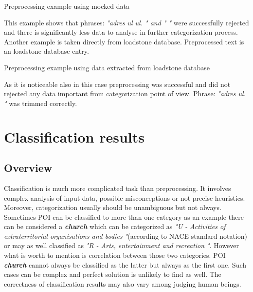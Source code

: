 \begin{algorithm}
	
	\hfill \break
	\caption{Preprocessing example using mocked data}
	\label{alg:1st}
\end{algorithm}

This example shows that phrases: \textit{"adres ul ul. " and " "} were successfully rejected and there is significantly less data to analyse in further categorization process.
\newline
Another example is taken directly from loadstone database. Preprocessed text is an loadstone database entry.
\begin{algorithm}
	
	\hfill \break
	\caption{Preprocessing example using data extracted from loadstone database}
	\label{alg:2nd}
\end{algorithm}
\newline
As it is noticeable also in this case preprocessing was successful and did not rejected any data important from categorization point of view. Phrase: \textit{"adres ul. "} was trimmed correctly.
 
  
\section{Classification results}
\label{classification_results}
\subsection{Overview}
Classification is much more complicated task than preprocessing. It involves complex analysis of input data, possible misconceptions or not precise heuristics. Moreover, categorization usually should be unambiguous but not always. Sometimes POI can be classified to more than one category as an example there can be considered a \textit{\textbf{church}} which can be categorized as \textit{"U - Activities of extraterritorial organisations and bodies "}(according to NACE standard notation) or may as well classified as \textit{"R - Arts, entertainment and recreation "}. However what is worth to mention is correlation between those two categories. POI \textit{\textbf{church}} cannot always be classified as the latter but always as the first one. Such cases can be complex and perfect solution is unlikely to find as well. The correctness of classification results may also vary among judging human beings.

